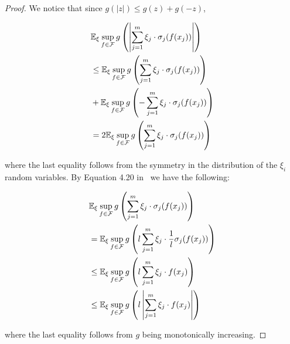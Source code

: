 \begin{proof}
We notice that since $g(|z|) \leq g(z)+g(-z)$,
\begin{small}
\begin{equation*}
\begin{aligned}
&\mathbb{E}_{\xi} \sup_{\substack{f\in \mathcal{F}}} g\left( \left| \sum^{m}_{j=1} \xi_j \cdot \sigma_j(f(x_j))\right| \right)\\
&\leq \mathbb{E}_{\xi} \sup_{\substack{f\in \mathcal{F}}} g\left( \sum^{m}_{j=1} \xi_j \cdot \sigma_j(f(x_j)) \right)\\
&+\mathbb{E}_{\xi} \sup_{\substack{f\in \mathcal{F}}} g\left( - \sum^{m}_{j=1} \xi_j \cdot \sigma_j(f(x_j)) \right) \\
&= 2\mathbb{E}_{\xi} \sup_{\substack{f\in \mathcal{F}}} g\left( \sum^{m}_{j=1} \xi_j \cdot \sigma_j(f(x_j)) \right)\\
\end{aligned}
\end{equation*}
\end{small}
where the last equality follows from the symmetry in the distribution of the $\xi_i$ random variables. By Equation 4.20 in~\cite{Ledoux1991ProbabilityIB}  we have the following:
\begin{small}
\begin{equation*}
\begin{aligned}
&\mathbb{E}_{\xi} \sup_{\substack{f\in \mathcal{F}}} g\left( \sum^{m}_{j=1} \xi_j \cdot \sigma_j(f(x_j)) \right)\\
&=\mathbb{E}_{\xi} \sup_{\substack{f\in \mathcal{F}}} g\left(l \sum^{m}_{j=1} \xi_j \cdot \frac{1}{l}\sigma_j(f(x_j)) \right)\\
&\leq\mathbb{E}_{\xi} \sup_{\substack{f\in \mathcal{F}}} g\left(l \sum^{m}_{j=1} \xi_j \cdot f(x_j) \right)\\
&\leq\mathbb{E}_{\xi} \sup_{\substack{f\in \mathcal{F}}} g\left(l \left| \sum^{m}_{j=1} \xi_j \cdot f(x_j) \right| \right)\\
\end{aligned}
\end{equation*}
\end{small}
where the last equality follows from $g$ being monotonically increasing. 
\end{proof}
